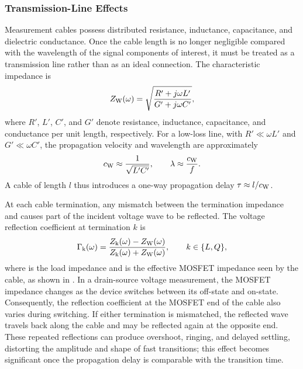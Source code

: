 \FloatBarrier

\subsubsection*{Transmission-Line Effects}
Measurement cables possess distributed resistance, inductance, capacitance, and dielectric conductance. 
Once the cable length is no longer negligible compared with the wavelength of the signal components of interest, it must be treated as a transmission line rather than as an ideal connection. 
The characteristic impedance is
\begin{equation}
    {Z}_{\mathrm{W}}(\omega) = \sqrt{\frac{R' + j\omega L'}{G' + j\omega C'}},
\end{equation}
where $R'$, $L'$, $C'$, and $G'$ denote resistance, inductance, capacitance, and conductance per unit length, respectively.
For a low-loss line, with $R' \ll \omega L'$ and $G' \ll \omega C'$, the propagation velocity and wavelength are approximately
\begin{equation}
    {c}_{\mathrm{W}} \approx \frac{1}{\sqrt{L'C'}},
    \qquad
    \lambda \approx \frac{{c}_{\mathrm{W}}}{f}.
\end{equation}
A cable of length $l$ thus introduces a one-way propagation delay $\tau \approx l/{c}_{\mathrm{W}}$.

At each cable termination, any mismatch between the termination impedance and  causes part of the incident voltage wave to be reflected. 
The voltage reflection coefficient at termination $k$ is
\begin{equation}
    {\Gamma}_{\mathrm{k}}(\omega) = \frac{{Z}_{\mathrm{k}}(\omega) - {Z}_{\mathrm{W}}(\omega)}{{Z}_{\mathrm{k}}(\omega) + {Z}_{\mathrm{W}}(\omega)},
    \qquad k \in \{L,Q\},
\end{equation}
where  is the load impedance and  is the effective MOSFET impedance seen by the cable, as shown in . 
In a drain-source voltage measurement, the MOSFET impedance  changes as the device switches between its off-state and on-state. 
Consequently, the reflection coefficient at the MOSFET end of the cable also varies during switching. 
If either termination is mismatched, the reflected wave travels back along the cable and may be reflected again at the opposite end. 
These repeated reflections can produce overshoot, ringing, and delayed settling, distorting the amplitude and shape of fast transitions; this effect becomes significant once the propagation delay is comparable with the transition time.

